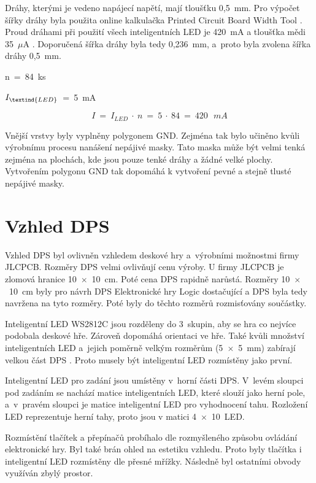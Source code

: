   Dráhy, kterými je vedeno napájecí napětí, mají tloušťku 0,5~mm. Pro výpočet šířky dráhy byla použita online kalkulačka Printed
  Circuit Board Width Tool \cite{Kalkulacka_drahy_DPS}. Proud dráhami při použití všech inteligentních LED je 420~mA a tloušťka 
  mědi 35~$\mu$A \cite{JLCPCB_Capabilities}. Doporučená šířka dráhy byla tedy 0,236~mm, a~proto byla zvolena šířka dráhy 0,5~mm.

  n~=~84~ks

  $I_\textind{LED}$~=~5~mA 

  \begin{equation} 
    I~=~I_{LED}~\cdot~n~=~5~\cdot~84~=~420~\:~mA
  \end{equation}

  Vnější vrstvy byly vyplněny polygonem GND. Zejména tak bylo učiněno kvůli výrobnímu procesu nanášení nepájivé masky. Tato maska
  může být velmi tenká zejména na plochách, kde jsou pouze tenké dráhy a žádné velké plochy. Vytvořením polygonu GND tak dopomáhá k 
  vytvoření pevné a stejně tlusté nepájivé masky. 

  \newpage
  \section{Vzhled DPS}
  Vzhled DPS byl ovlivněn vzhledem deskové hry a~výrobními možnostmi firmy JLCPCB. Rozměry DPS velmi ovlivňují cenu výroby. U firmy 
  JLCPCB je zlomová hranice 10~$\times$~10~cm. Poté cena DPS rapidně narůstá. Rozměry 10~$\times$~10~cm byly pro návrh DPS Elektronické 
  hry Logic dostačující a DPS byla tedy navržena na tyto rozměry. Poté byly do těchto rozměrů rozmisťovány součástky. 

  Inteligentní LED WS2812C jsou rozděleny do 3~skupin, aby se hra co nejvíce podobala deskové hře. Zároveň dopomáhá orientaci ve hře.
  Také kvůli množství inteligentních LED a~jejich poměrně velkým rozměrům (5~$\times$~5~mm) zabírají velkou část DPS 
  \cite{WS2812C_datasheet}. Proto musely být inteligentní LED rozmístěny jako první.

  Inteligentní LED pro zadání jsou umístěny v~horní části DPS. V~levém sloupci pod zadáním se nachází matice inteligentních LED, které slouží jako herní 
  pole, a~v~pravém sloupci je matice inteligentní LED pro vyhodnocení tahu. Rozložení LED reprezentuje herní tahy, proto jsou v matici 4~$\times$~10~LED.
  
  Rozmístění tlačítek a přepínačů probíhalo dle 
  rozmyšleného způsobu ovládání elektronické hry. Byl také brán ohled na estetiku vzhledu. Proto byly tlačítka i inteligentní LED
  rozmístěny dle přesné mřížky. Následně byl ostatními obvody využíván zbylý prostor. 

